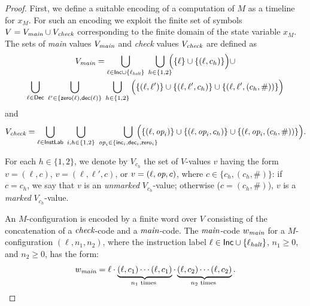 \begin{proof}
First, we define a suitable encoding of a computation of $M$ as a timeline for $x_M$.
For such an encoding we exploit the
finite set of symbols $V= V_{{\textit{main}}}\cup V_{{\textit{check}}}$ corresponding to the finite domain of the state variable $x_M$.
The sets of \emph{main} values $V_{{\textit{main}}}$ and \emph{check} values $V_{{\textit{check}}}$
are defined as
\begin{multline*}
V_{\main} = \bigcup_{\ell\in \Inc\cup\{\ell_\halt\}}\; \smashoperator[r]{\bigcup_{h\in\{1,2\}}}\; \Big(\{\ell\}\cup \{(\ell,c_h)\}\Big)\cup \\
 \bigcup_{\ell\in \Dec}\;\bigcup_{\ell' \in \{\zero(\ell),\dec(\ell)\}}\;\bigcup_{h\in\{1,2\}}\Big( \{(\ell,\ell')\}\cup   \{(\ell,\ell',c_h)\}\cup \{(\ell,\ell',(c_h,\#))\} \Big)
\end{multline*}
and
\[
V_{\Checking} = \bigcup_{\ell\in \InstructLab}\;\bigcup_{i,h\in\{1,2\}}\;\smashoperator[r]{\bigcup_{\op_i \in \{\inc_i,\dec_i,\zero_i\}}}\; \Big( \{(\ell,\op_i)\}\cup   \{(\ell,\op_i,c_h)\}\cup \{(\ell,\op_i,(c_h,\#))\} \Big).
\]
 
For each $h\in\{1,2\}$, we denote by $V_{c_h}$ the set of $V$-values $v$
having 
the 
form $v=(\ell,c)$, 
$v=(\ell,\ell',c)$, or $v=(\ell,{\textit{op}},c)$, where $c\in\{c_h,(c_h,\#)\}$:  if $c=c_h$, we say that $v$ is an \emph{unmarked} $V_{c_h}$-value; otherwise ($c=(c_h,\#)$), $v$ is a \emph{marked} $V_{c_h}$-value.

An $M$-configuration is encoded by a finite word over $V$ consisting of the concatenation of a ${\textit{check}}$-code and a ${\textit{main}}$-code.
%
The ${\textit{main}}$-code $w_{\textit{main}}$  for a $M$-configuration $(\ell,n_1,n_2)$, where the instruction label  $\ell\in \mathsf{Inc}\cup\{\ell_{\textit{halt}}\}$, $n_1\geq 0$, and $n_2\geq 0$, has the form:
\[
w_{\textit{main}} = \ell \cdot  \underbrace{(\ell,c_1)\cdots(\ell,c_1)}_{n_1 \text{ times }} \cdot \underbrace{(\ell,c_2)\cdots(\ell,c_2)}_{n_2 \text{ times }}.
\]


\end{proof}
